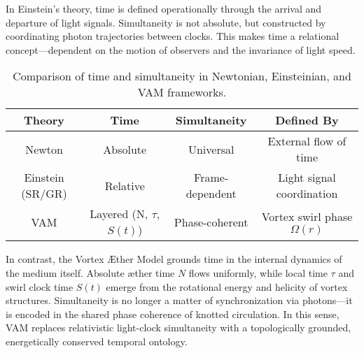     In Einstein’s theory, time is defined operationally through the arrival and departure of light signals. Simultaneity is not absolute, but constructed by coordinating photon trajectories between clocks. This makes time a relational concept—dependent on the motion of observers and the invariance of light speed.

    \begin{table}[h!]
        \centering
        \begin{tabular}{|c|c|c|c|}
            \hline
            \textbf{Theory} & \textbf{Time} & \textbf{Simultaneity} & \textbf{Defined By} \\
            \hline
            Newton & Absolute & Universal & External flow of time \\
            Einstein (SR/GR) & Relative & Frame-dependent & Light signal coordination \\
            VAM & Layered (N, $\tau$, $S(t)$) & Phase-coherent & Vortex swirl phase $\Omega(r)$ \\
            \hline
        \end{tabular}
        \caption{Comparison of time and simultaneity in Newtonian, Einsteinian, and VAM frameworks.}
    \end{table}

    In contrast, the Vortex Æther Model grounds time in the internal dynamics of the medium itself. Absolute æther time \( N \) flows uniformly, while local time \( \tau \) and swirl clock time \( S(t) \) emerge from the rotational energy and helicity of vortex structures. Simultaneity is no longer a matter of synchronization via photons—it is encoded in the shared phase coherence of knotted circulation. In this sense, VAM replaces relativistic light-clock simultaneity with a topologically grounded, energetically conserved temporal ontology.






